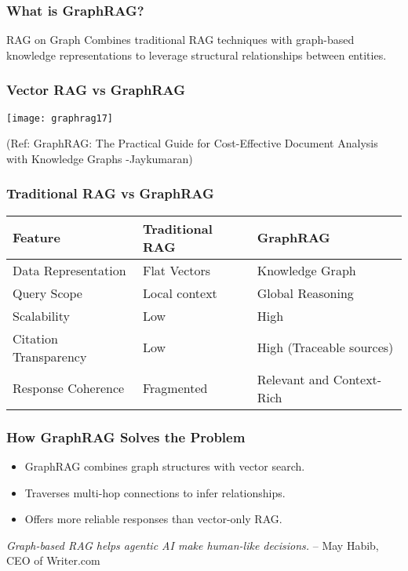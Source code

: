 \begin{frame}[fragile]\frametitle{What is GraphRAG?}

    \begin{block}{RAG on Graph}
    Combines traditional RAG techniques with graph-based knowledge representations to leverage structural relationships between entities.
    \end{block}
\end{frame}


\begin{frame}[fragile]\frametitle{Vector RAG vs GraphRAG}

	
	\begin{center}
	\texttt{[image: graphrag17]}
	
	{\tiny (Ref: GraphRAG: The Practical Guide for Cost-Effective Document Analysis with Knowledge Graphs -Jaykumaran)}
	\end{center}	
\end{frame}

\begin{frame}[fragile]\frametitle{Traditional RAG vs GraphRAG}
    \begin{table}[]
        \centering
        \begin{tabular}{|l|l|l|}
            \hline
            \textbf{Feature} & \textbf{Traditional RAG} & \textbf{GraphRAG} \\
            \hline
            Data Representation & Flat Vectors & Knowledge Graph \\
            \hline
            Query Scope & Local context & Global Reasoning \\
            \hline
            Scalability & Low & High \\
            \hline
            Citation Transparency & Low & High (Traceable sources) \\
            \hline
            Response Coherence & Fragmented & Relevant and Context-Rich \\
            \hline
        \end{tabular}
    \end{table}
\end{frame}

\begin{frame}[fragile]\frametitle{How GraphRAG Solves the Problem}
    \begin{itemize}
        \item GraphRAG combines graph structures with vector search.
        \item Traverses multi-hop connections to infer relationships.
        \item Offers more reliable responses than vector-only RAG.
    \end{itemize}

\textit{Graph-based RAG helps agentic AI make human-like decisions.} 
– May Habib, CEO of Writer.com
\end{frame}




